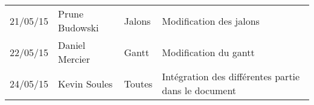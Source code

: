 \small
\begin{tabular}{|p{1.5cm}| >{\raggedright}p{2.9cm}| >{\raggedright}p{3.2cm}|p{7.2cm}|}
  \hline
  \rowcolor{Gainsboro} \color{Navy}{\bfseries Date}  & \color{Navy}{\bfseries Auteur} & \color{Navy}{\bfseries Section(s)}  &\color{Navy}{\bfseries Commentaires} \\
  \hline
  21/05/15 & Prune Budowski & Jalons & Modification des jalons\\
  \hline
  22/05/15 & Daniel Mercier & Gantt & Modification du gantt\\
  \hline
  24/05/15 & Kevin Soules & Toutes & Intégration des différentes partie dans le document\\
  \hline
\end{tabular}
\normalsize
